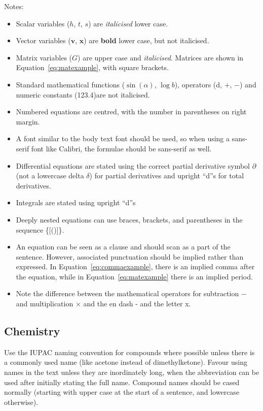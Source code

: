 \documentclass[a5paper, 10pt]{article}
\begin{document}
Notes:
\begin{itemize}
\item Scalar variables ($h$, $t$, $s$) are \emph{italicised} lower case.
\item Vector variables ($\mathbf{v}$, $\mathbf{x}$) are \textbf{bold}
  lower case, but not italicised.
\item Matrix variables ($G$) are upper case and \emph{italicised}.
  Matrices are shown in Equation~\ref{eq:matexample}, with
  square brackets.
\item Standard mathematical functions ($\sin(\alpha)$, $\log b$), operators (d,
  $+$, $-$) and
  numeric constants (\num{123.4})are not italicised.
\item Numbered equations are centred, with the number in parentheses on
  right margin.
\item A font similar to the body text font should be used, so when
  using a sans-serif font like Calibri, the formulae should be
  sans-serif as well.
\item Differential equations are stated using the correct partial
  derivative symbol $\partial$ (not a lowercase delta $\delta$) for
  partial derivatives and upright ``d''s  for total derivatives.
\item Integrals are stated using upright ``d''s
\item Deeply nested equations can use braces, brackets, and parentheses in the
  sequence \{[()]\}.
\item An equation can be seen as a clause and should scan as a part of
  the sentence.  However, associated punctuation should be implied
  rather than expressed.  In Equation~\ref{eq:commaexample}, there is
  an implied comma after the equation, while in
  Equation~\ref{eq:matexample} there is an implied period.
\item Note the difference between the mathematical operators for subtraction $-$ and multiplication $\times$ and the en dash - and the letter x. 
\end{itemize}

\subsection{Chemistry}
Use the IUPAC naming convention for compounds where possible unless
there is a commonly used name (like acetone instead of
dimethylketone).  Favour using names in the text unless they are
inordinately long, when the abbreviation can be used after initially
stating the full name.  Compound names should be cased normally
(starting with upper case at the start of a sentence, and lowercase
otherwise).
\end{document}
